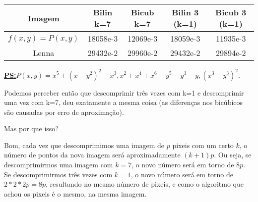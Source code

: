 \documentclass[12pt]{article}
\newcommand{\mytitle}[1]{\textbf{\underline{#1}}}
\begin{document}
\begin{center}
  \begin{tabular}{||c | c | c  | c | c||} 
    \hline
    Imagem & Bilin k=7 & Bicub k=7 & Bilin 3 (k=1) & Bicub 3 (k=1)\\[0.5ex] 
    \hline\hline
    $f(x, y) = P(x, y)$ & 18058e-3 & 12069e-3 & 18059e-3 & 11935e-3 \\
    \hline
    Lenna & 29432e-2 & 29960e-2 & 29432e-2 & 29894e-2 \\[1ex]
    \hline    
  \end{tabular}
\end{center}

\mytitle{PS:}$P(x, y) = x^5 + (x - y^2)^2 - x^3, x^2 + x^4 + x^6 - y^5 - y^3 - y, (x^3 - y^3)^2$.

Podemos perceber então que descomprimir três vezes com k=1 e descomprimir uma vez com k=7, deu exatamente a mesma coisa (as diferenças nos bicúbicos são causadas por erro de aproximação).

Mas por que isso?

Bom, cada vez que descomprimimos uma imagem de $p$ pixeis com um certo $k$, o número de pontos da nova imagem será aproximadamente $(k+1)p$. Ou seja, se descomprimirmos uma imagem com $k=7$, o novo número será em torno de $8p$. Se descomprimirmos três vezes com $k=1$, o novo número será em torno de $2*2*2p = 8p$, resultando no mesmo número de pixeis, e como o algoritmo que achou os pixeis é o mesmo, na mesma imagem.
\end{document}
